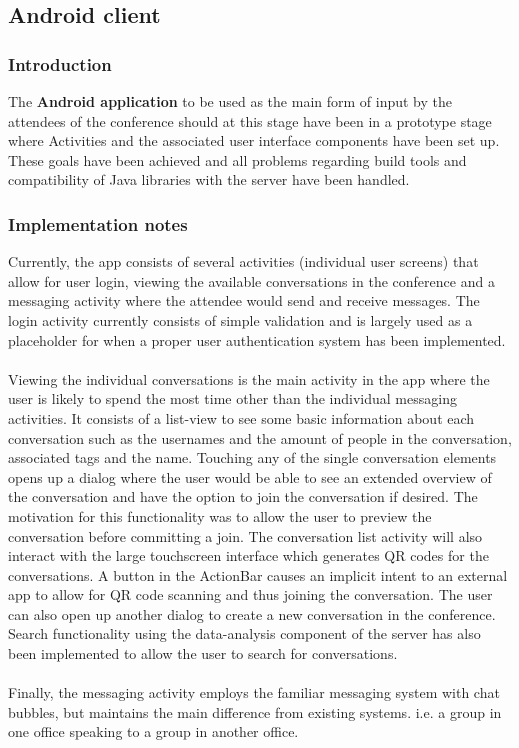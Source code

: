 \documentclass[12p, a4paper, onecolumn]{report}
\begin{document}
\subsection{Android client}

\subsubsection{Introduction}

The \textbf{Android application} to be used as the main form of input by the attendees of the conference should at this stage have been in a prototype stage where Activities and the associated user interface components have been set up. These goals have been achieved and all problems regarding build tools and compatibility of Java libraries with the server have been handled.

\subsubsection{Implementation notes}

Currently, the app consists of several activities (individual user screens) that allow for user login, viewing the available conversations in the conference and a messaging activity where the attendee would send and receive messages. The login activity currently consists of simple validation and is largely used as a placeholder for when a proper user authentication system has been implemented. \\ \\
Viewing the individual conversations is the main activity in the app where the user is likely to spend the most time other than the individual messaging activities. It consists of a list-view to see some basic information about each conversation such as the usernames and the amount of people in the conversation, associated tags and the name. Touching any of the single conversation elements opens up a dialog where the user would be able to see an extended overview of the conversation and have the option to join the conversation if desired. The motivation for this functionality was to allow the user to preview the conversation before committing a join. The conversation list activity will also interact with the large touchscreen interface which generates QR codes for the conversations. A button in the ActionBar causes an implicit intent to an external app to allow for QR code scanning and thus joining the conversation. The user can also open up another dialog to create a new conversation in the conference. Search functionality using the data-analysis component of the server has also been implemented to allow the user to search for conversations. \\ \\
Finally, the messaging activity employs the familiar messaging system with chat bubbles, but maintains the main difference from existing systems. i.e. a group in one office speaking to a group in another office.
\end{document}
